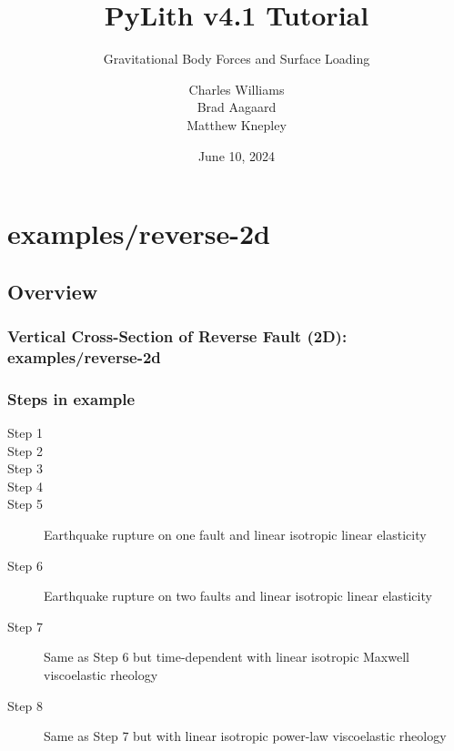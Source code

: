 \documentclass[aspectratio=169]{beamer}
\title{PyLith v4.1 Tutorial}
\subtitle{Gravitational Body Forces and Surface Loading}
\author{Charles Williams \\
  Brad Aagaard \\
  Matthew Knepley}
\institute{\texttt{[image: ../../logos/cig\_logo\_dots]}%
  \hspace{4em}%
\raisebox{1em}{\texttt{[image: ../../logos/cig\_short\_pylith]}}}
\date{June 10, 2024}
\begin{document}
\maketitle


\section{{\ttfamily examples/reverse-2d}}
\subsection{Overview}

\begin{frame}
  \frametitle{Vertical Cross-Section of Reverse Fault (2D): {\ttfamily examples/reverse-2d}}
  \summary{}


\end{frame}


\begin{frame}
  \frametitle{Steps in example}

  \begin{description}
    \item[Step 1] 
    \item[Step 2] 
    \item[Step 3] 
    \item[Step 4] 
    \item[Step 5] Earthquake rupture on one fault and linear isotropic linear elasticity
    \item[Step 6] Earthquake rupture on two faults and linear isotropic linear elasticity
    \item[Step 7] Same as Step 6 but time-dependent with linear isotropic Maxwell viscoelastic rheology
    \item[Step 8] Same as Step 7 but with linear isotropic power-law viscoelastic rheology
  \end{description}
  
\end{frame}
\end{document}
